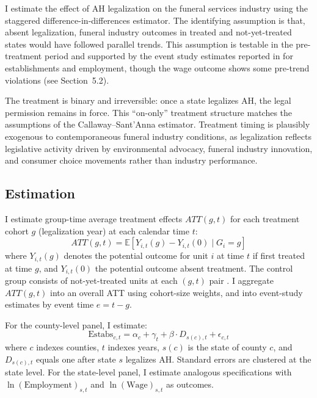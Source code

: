 \documentclass[12pt]{article}
\newcommand{\E}{\mathbb{E}}
\begin{document}
I estimate the effect of AH legalization on the funeral services industry using the \citet{callaway2021difference} staggered difference-in-differences estimator. The identifying assumption is that, absent legalization, funeral industry outcomes in treated and not-yet-treated states would have followed parallel trends. This assumption is testable in the pre-treatment period and supported by the event study estimates reported in  for establishments and employment, though the wage outcome shows some pre-trend violations (see Section~5.2).

The treatment is binary and irreversible: once a state legalizes AH, the legal permission remains in force. This ``on-only'' treatment structure matches the assumptions of the Callaway--Sant'Anna estimator. Treatment timing is plausibly exogenous to contemporaneous funeral industry conditions, as legalization reflects legislative activity driven by environmental advocacy, funeral industry innovation, and consumer choice movements rather than industry performance.

\subsection{Estimation}

I estimate group-time average treatment effects $ATT(g,t)$ for each treatment cohort $g$ (legalization year) at each calendar time $t$:
\begin{equation}
ATT(g,t) = \E\left[Y_{i,t}(g) - Y_{i,t}(0) \mid G_i = g\right]
\end{equation}
where $Y_{i,t}(g)$ denotes the potential outcome for unit $i$ at time $t$ if first treated at time $g$, and $Y_{i,t}(0)$ the potential outcome absent treatment. The control group consists of not-yet-treated units at each $(g,t)$ pair \citep{callaway2021difference}. I aggregate $ATT(g,t)$ into an overall ATT using cohort-size weights, and into event-study estimates by event time $e = t - g$.

For the county-level panel, I estimate:
\begin{equation}
\text{Estabs}_{c,t} = \alpha_c + \gamma_t + \beta \cdot D_{s(c),t} + \epsilon_{c,t}
\end{equation}
where $c$ indexes counties, $t$ indexes years, $s(c)$ is the state of county $c$, and $D_{s(c),t}$ equals one after state $s$ legalizes AH. Standard errors are clustered at the state level. For the state-level panel, I estimate analogous specifications with $\ln(\text{Employment})_{s,t}$ and $\ln(\text{Wage})_{s,t}$ as outcomes.
\end{document}
